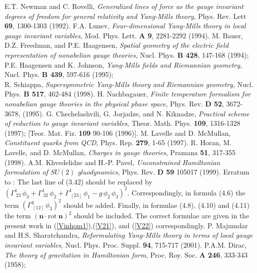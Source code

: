 \documentclass[a4paper,12pt]{article}
\begin{document}
\begin{thebibliography}{99}
E.T. Newman and C. Rovelli,
{\it Generalized lines of force as the gauge invariant degrees of freedom
for general relativity and Yang-Mills theory},
Phys. Rev. Lett {\bf 69}, 1300-1303 (1992).
%
F.A. Lunev,
{\it Four-dimensional Yang-Mills theory in local gauge invariant variables},
Mod. Phys. Lett. {\bf A 9}, 2281-2292 (1994).
%
M. Bauer, D.Z. Freedman, and P.E. Haagensen,
{\it Spatial geometry of the electric field representation of nonabelian
gauge theories},
Nucl. Phys. {\bf B 428}, 147-168 (1994);\\
%
P.E. Haagensen and K. Johnson,
{\it Yang-Mills fields and Riemannian geometry},
Nucl. Phys.  {\bf B 439}, 597-616 (1995);\\
%
R. Schiappa,
{\it Supersymmetric Yang-Mills theory and Riemannian geometry},
Nucl. Phys. {\bf B 517}, 462-484 (1998).
%
H. Nachbagauer,
{\it Finite temperature formalism for nonabelian gauge theories in the
physical phase space},
Phys. Rev. {\bf D 52}, 3672-3678, (1995).
%
G. Chechelashvili, G. Jorjadze, and N. Kiknadze,
{\it Practical scheme of reduction to gauge invariant variables},
Theor. Math. Phys. {\bf 109}, 1316-1328 (1997);
[Teor. Mat. Fiz. {\bf 109} 90-106 (1996)].
%
M. Lavelle and D. McMullan,
{\it Constituent quarks from QCD},
Phys. Rep. {\bf 279}, 1-65 (1997).
%
R. Horan, M. Lavelle, and D. McMullan,
{\it Charges in gauge theories},
Pramana {\bf 51}, 317-355 (1998).
%
A.M. Khvedelidze and H.-P. Pavel,
{\it Unconstrained Hamiltonian formulation of $SU(2)$ gluodynamics},
Phys. Rev. {\bf D 59} 105017 (1999).
%
Erratum to \cite{KP}: The last line of (3.42) should be replaced by
$\left(\Gamma^1_{\ 23}\, \phi_3 + \Gamma^1_{\ 32}\, \phi_2 +
\Gamma^1_{\ [23]}\, \phi_1 - g\, \phi_2\, \phi_3\right)^2$.
Correspondingly, in formula (4.6) the term
$\left(\Gamma^3_{\ [12]}\, \phi_3\right)^2$
should be added.
Finally, in formulae (4.8), (4.10) and (4.11) the term
$\left({\mathbf n}\cdot \mbox{rot}\ {\mathbf n} \right)^2$
should be included.
The correct formulae are given in the present work in
(\ref{Vinhom1}),(\ref{V21}), and (\ref{V22}) correspondingly.
%
P. Majumdar and H.S. Sharatchandra,
{\it Reformulating Yang-Mills theory in terms of local gauge invariant variables},
Nucl. Phys. Proc. Suppl. {\bf 94}, 715-717 (2001).
%
P.A.M. Dirac,
{\it The theory of gravitation in Hamiltonian form},
Proc. Roy. Soc. {\bf A 246}, 333-343 (1958);\\

\end{thebibliography}
\end{document}
